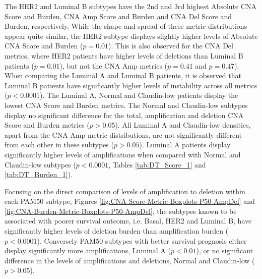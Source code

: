 The HER2 and Luminal B subtypes have the 2nd and 3rd highest Absolute CNA Score and Burden, CNA Amp Score and Burden and CNA Del Score and Burden, respectively. While the shape and spread of these metric distributions appear quite similar, the HER2 subtype displays slightly higher levels of Absolute CNA Score and Burden ($p = 0.01$). This is also observed for the CNA Del metrics, where HER2 patients have higher levels of deletions than Luminal B patients ($p = 0.01$), but not the CNA Amp metrics ($p = 0.41$ and $p = 0.47$). When comparing the Luminal A and Luminal B patients, it is observed that Luminal B patients have significantly higher levels of instability across all metrics ($p<0.0001$). The Luminal A, Normal and Claudin-low patients display the lowest CNA Score and Burden metrics. The Normal and Claudin-low subtypes display no significant difference for the total, amplification and deletion CNA Score and Burden metrics ($p>0.05$). All Luminal A and Claudin-low densities, apart from the CNA Amp metric distributions, are not significantly different from each other in these subtypes ($p>0.05$). Luminal A patients display significantly higher levels of amplifications when compared with Normal and Claudin-low subtypes ($p < 0.0001$, Tables \ref{tab:DT_Score_1} and \ref{tab:DT_Burden_1}). 

Focusing on the direct comparison of levels of amplification to deletion within each PAM50 subtype, Figures \ref{fig:CNA-Score-Metric-Boxplots-P50-AmpDel} and \ref{fig:CNA-Burden-Metric-Boxplots-P50-AmpDel}, the subtypes known to be associated with poorer survival outcome, i.e. Basal, HER2 and Luminal B, have significantly higher levels of deletion burden than amplification burden ($p<0.0001$). Conversely PAM50 subtypes with better survival prognosis either display significantly more amplifications, Luminal A ($p < 0.01$), or no significant difference in the levels of amplifications and deletions, Normal and Claudin-low ($p > 0.05$).

